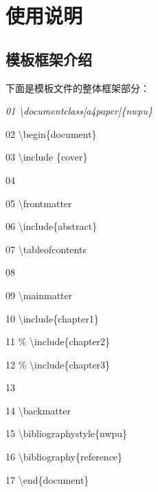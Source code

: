 \documentclass{nwpu}
\begin{document}

    \chapter{使用说明}
        \section{模板框架介绍}
            下面是模板文件的整体框架部分：
                \vskip 10pt
                \hskip 1cm
                \begin{minipage}[t]{8cm}
                    \it
                    01 \qquad\textbackslash documentclass[a4paper]\{nwpu\}   \par
                    02 \qquad\textbackslash begin\{document\}                \par
                    03 \qquad\textbackslash include \{cover\}                \par
                    04 \                                               \par
                    05 \qquad\textbackslash frontmatter                      \par
                    06 \qquad\textbackslash include\{abstract\}              \par
                    07 \qquad\textbackslash tableofcontents                  \par
                    08 \                                               \par
                    09 \qquad\textbackslash mainmatter                       \par
                    10 \qquad\textbackslash include\{chapter1\}              \par
                    11 \qquad\% \textbackslash include\{chapter2\}           \par
                    12 \qquad\% \textbackslash include\{chapter3\}           \par
                    13 \                                               \par
                    14 \qquad\textbackslash backmatter                       \par
                    15 \qquad\textbackslash bibliographystyle\{nwpu\}        \par
                    16 \qquad\textbackslash bibliography\{reference\}        \par
                    17 \qquad\textbackslash end\{document\}                  \par
                \end{minipage}
\end{document}
